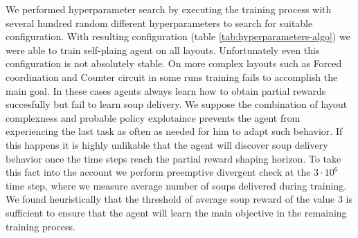 We performed hyperparameter search by executing the training process with several hundred random different hyperparameters to search for suitable configuration.
With resulting configuration (table \ref{tab:hyperparameters-algo}) we were able to train self-plaing agent on all layouts.
Unfortunately even this configuration is not absolutely stable.
On more complex layouts such as Forced coordination and Counter circuit in some runs training fails to accomplish the main goal.
In these cases agents always learn how to obtain partial rewards succesfully but fail to learn soup delivery.
We suppose the combination of layout complexness and probable policy explotaince prevents the agent from experiencing the last task as often as needed for him to adapt such behavior.
If this happens it is highly unlikable that the agent will discover soup delivery behavior once the time steps reach the partial reward shaping horizon.
To take this fact into the account we perform preemptive divergent check at the $3\cdot10^6$ time step, where we measure average number of soups delivered during training.
We found heuristically that the threshold of average soup reward of the value $3$ is sufficient to ensure that the agent will learn the main objective in the remaining training process.


